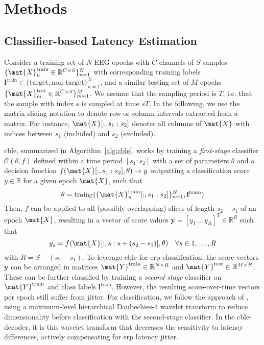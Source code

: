 \section{Methods}

\subsection{Classifier-based Latency Estimation}
\label{sec:cble}

Consider a training set of $N$ EEG epochs with $C$ channels of $S$
samples $\{\mat{X}_n^\mathrm{train} \in \mathbb{R}^{C\times S}\}_{n=1}^N$
with corresponding training labels $\mathbf{l^\mathrm{train}} \in \{\mathrm{target},
	\textrm{non-target}\}_{n=1}^N$, and a
similar testing set of $M$ epochs $\{\mat{X}_m^\mathrm{test} \in
	\mathbb{R}^{C\times S}\}_{m=1}^M$.
We assume that the sampling period is $T$, i.e. that the sample with index $s$ is sampled at time $sT$.
In the following, we use the matrix slicing notation to denote row or column intervals extracted from a matrix.
For instance, $\mat{X}[:,s_1:s_2]$ denotes all columns of $\mat{X}$ with indices between $s_1$ (included) and $s_2$ (excluded).

\ac{cble}, summarized in Algorithm~\ref{alg:cble}, works by training a
\textit{first-stage} classifier $\mathcal{C}(\theta,f)$
defined within a time period $[s_1:s_2]$ with a set of parameters $\theta$ and a
decision function $f(\mat{X}[:,s_1:s_2],\theta) \rightarrow
y$ outputting a classification score $y\in\mathbb{R}$ for a given epoch $\mat{X}$,
such that
\begin{equation}
  \theta = \mathrm{train}_\mathcal{C}(\{\mat{X}_n^\mathrm{train}[:,s_1:s_2]\}_{n=1}^N,\mathbf{l}^\mathrm{train})
  \label{eq:cble-train}
\end{equation}
Then,
$f$ can be applied to all (possibly overlapping) slices of length $s_2-s_1$ of
an epoch $\mat{X}$, resulting in a vector of score values
$\mathbf{y}=[y_1\,\ldots\,y_R]^T \in\mathbb{R}^R$ such that
\begin{equation}
  y_s = f(\mat{X}[:,s:s+(s_2-s_1)],\theta)\quad \forall s\in 1,\ldots,R
	\label{eq:score}
\end{equation}
with $R = S-(s_2-s_1)$.
To leverage \ac{cble} for \ac{erp} classification, the score vectors $\mathbf{y}$ can be
arranged in matrices $\mat{Y}^\mathrm{train}\in\mathbb{R}^{N\times R}$ and $\mat{Y}^\mathrm{test}\in\mathbb{R}^{M\times R}$.
These can be further classified by training a \textit{second-stage} classifier on
$\mat{Y}^\mathrm{train}$ and class labels $\mathbf{l}^\mathrm{train}$.
However, the resulting score-over-time vectors per epoch still suffer from jitter.
For classification, we follow the approach of \cite{Mowla2017}, using a
maximum-level hierarchical Daubechies-4 wavelet transform to reduce
dimensionality before classification with the second-stage classifier.
In the \ac{cble}-decoder, it is this wavelet transform that decreases the sensitivity
to latency differences, actively compensating for \ac{erp} latency jitter.

